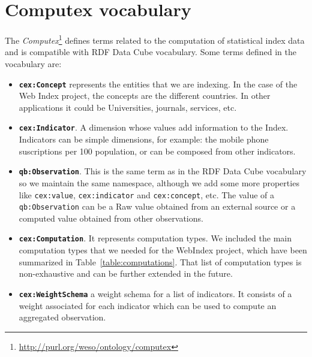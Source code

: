 \documentclass{llncs}
\begin{document}
\section{Computex vocabulary}

The \emph{Computex}\footnote{\url{http://purl.org/weso/ontology/computex}} defines terms related to the
computation of statistical index data and is compatible with RDF Data Cube
vocabulary. Some terms defined in the vocabulary are:

\begin{itemize}
\item\textbf{\lstinline|cex:Concept|} represents the entities that we are
indexing.
In the case of the Web Index project, the concepts are the different countries.
In other applications it could be Universities, journals, services, etc.

\item\textbf{\lstinline|cex:Indicator|}. A dimension whose values add
information to the Index.
Indicators can be simple dimensions, for example: the mobile phone
suscriptions per 100 population, or can be composed from other
indicators. 

\item\textbf{\lstinline|qb:Observation|}. This is the same term as in the 
RDF Data Cube vocabulary so we maintain the same namespace, although we add some more properties like \lstinline|cex:value|, \lstinline|cex:indicator| 
and \lstinline|cex:concept|, etc. 
The value of a \lstinline|qb:Observation| can be a Raw value
   obtained from an external source or a computed value obtained from other
   observations.

\item\textbf{\lstinline|cex:Computation|}. It represents computation
types. We included the main computation types that we needed for the WebIndex project, which have been summarized in
Table~\ref{table:computations}. That list of computation types is non-exhaustive
and can be further extended in the future. 

\item\textbf{\lstinline|cex:WeightSchema|} a weight schema for a list of
indicators. It consists of a weight associated for each indicator which can be
used to compute an aggregated observation.

\end{itemize}
\end{document}
